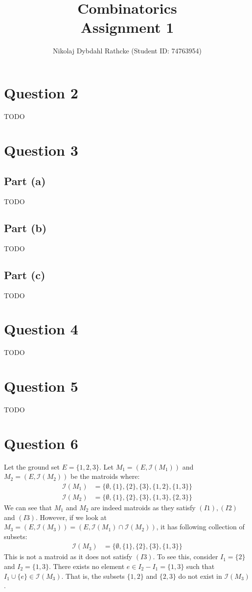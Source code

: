 \documentclass[a4paper, fleqn]{article}
\author{Nikolaj Dybdahl Rathcke (Student ID: 74763954)}
\title{Combinatorics \\ Assignment 1}
\begin{document}
\maketitle

\section*{Question 2}
TODO

\section*{Question 3}

\subsection*{Part (a)}
TODO

\subsection*{Part (b)}
TODO

\subsection*{Part (c)}
TODO

\section*{Question 4}
TODO

\section*{Question 5}
TODO

\section*{Question 6}
Let the ground set $E=\{1,2,3\}$. Let $M_1=(E, \mathcal{I}(M_1))$ and $M_2=(E, \mathcal{I}(M_2))$ be the matroids where:
\begin{align*}
  \mathcal{I}(M_1)&=\{\emptyset, \{1\}, \{2\}, \{3\}, \{1,2\}, \{1,3\}\} \\
  \mathcal{I}(M_2)&=\{\emptyset, \{1\}, \{2\}, \{3\}, \{1,3\}, \{2,3\}\}
\end{align*}
We can see that $M_1$ and $M_2$ are indeed matroids as they satisfy $(I1),(I2)$ and $(I3)$. However, if we look at $M_3=(E, \mathcal{I}(M_3))=(E, \mathcal{I}(M_1)\cap \mathcal{I}(M_2))$, it has following collection of subsets:
\begin{align*}
  \mathcal{I}(M_3)&=\{\emptyset, \{1\}, \{2\}, \{3\}, \{1,3\}\}
\end{align*}
This is not a matroid as it does not satisfy $(I3)$. To see this, consider $I_1=\{2\}$ and $I_2=\{1,3\}$. There exists no element $e\in I_2-I_1=\{1,3\}$ such that $I_1\cup \{e\}\in \mathcal{I}(M_3)$. That is, the subsets $\{1,2\}$ and $\{2,3\}$ do not exist in $\mathcal{I}(M_3)$.
\end{document}

